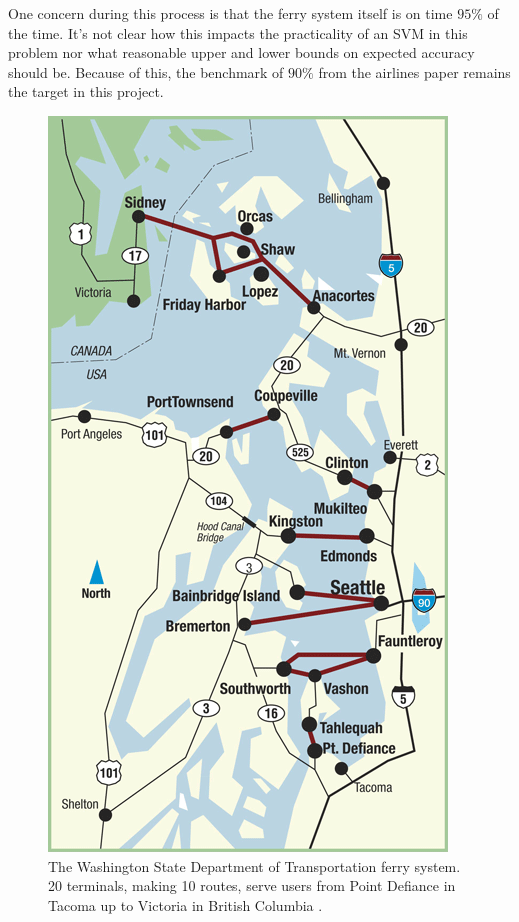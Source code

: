 \documentclass[11pt]{article} %
\begin{document}
One concern during this process is that the ferry 
system itself is on time $95\%$ of the time. It's not clear how this impacts the
practicality of an SVM in this problem nor what reasonable upper and lower bounds
on expected accuracy should be. Because of this, the benchmark of $90\%$ from the
airlines paper \cite{smith2008decision} remains the target in this project.

\begin{figure}
  \centering
  \includegraphics[scale=.4]{images/route-map-overview.png}
  \caption{The Washington State Department of Transportation ferry system. 20
  terminals, making 10 routes, serve users from Point Defiance in Tacoma up to
  Victoria in British Columbia \cite{wsdotVesselWatch}.}
  \label{fig:ferry_system}
\end{figure}
\end{document}
